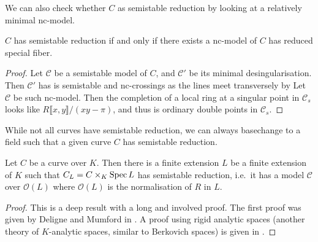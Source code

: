 We can also check whether $C$ as semistable reduction by looking at a relatively minimal nc-model. 
\begin{lemma}\label{lem:semistable_nc_model}
	$C$ has semistable reduction if and only if there exists a nc-model of  $C$ has reduced special fiber. 
\end{lemma}
\begin{proof}
	\ltr Let $ \mathscr C$ be a semistable model of $C$, and $\mathscr C'$ be its minimal desingularisation. 
	Then $\mathscr C'$ has is semistable and nc-crossings as the lines meet transversely by \cite[cor.\ 10.3.25]{liuAlgebraicGeometryArithmetic2002}
	\rtl Let  $\mathscr C$ be such nc-model. 
	Then the completion of a local ring at a singular point in $\mathscr C_s$ looks like $R\llbracket x, y \rrbracket /(xy - \pi)$, and thus is ordinary double points in $\mathscr C_s$.
\end{proof}



While not all curves have semistable reduction, we can always basechange to a field such that a given curve  $C$ has semistable reduction. 

\begin{theorem}
	Let $C$ be a curve over $K$. 
	Then there is a finite extension $L$ be a finite extension of $K$ such that $C_L  = C \times _K \operatorname{Spec} L$ has semistable reduction, i.e.\
	it has a model $\mathscr C$ over $\mathcal{O}(L)$ where $\mathcal{O}(L)$ is the normalisation of $R$ in $L$. 
\end{theorem}
\begin{proof}
	This is a deep result with a long and involved proof. 
	The first proof was given by Deligne and Mumford in \cite{deligneIrreducibilitySpaceCurves1969}. 
	A proof using rigid analytic spaces (another theory of $K$-analytic spaces, similar to Berkovich spaces) is given in \cite{arzdorfAnotherProofSemistable2012}.
\end{proof}
